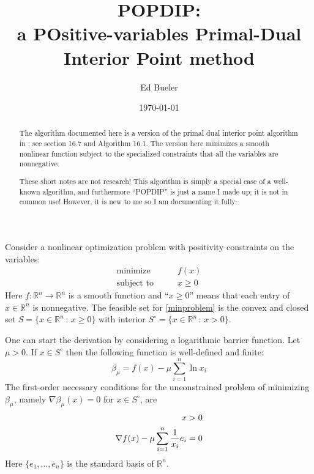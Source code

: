 \documentclass[11pt]{article}
\title{POPDIP: \\ a POsitive-variables Primal-Dual Interior Point method}
\author{Ed Bueler}
\date{\today}
\newcommand{\RR}{\mathbb{R}}
\newcommand{\grad}{\nabla}
\begin{document}
\maketitle

\begin{abstract}
The algorithm documented here is a version of the primal dual interior point algorithm in \cite{GrivaNashSofer2009}; see section 16.7 and Algorithm 16.1.  The version here minimizes a smooth nonlinear function subject to the specialized constraints that all the variables are nonnegative.

These short notes are not research!  This algorithm is simply a special case of a well-known algorithm, and furthermore ``POPDIP'' is just a name I made up; it is not in common use!  However, it is new to me so I am documenting it fully.
\end{abstract}

\thispagestyle{empty}

\bigskip
Consider a nonlinear optimization problem with positivity constraints on the variables:
\begin{equation}
\begin{matrix}
\text{minimize} \qquad & f(x) \\
\text{subject to} \qquad & x \ge 0
\end{matrix} \label{minproblem}
\end{equation}
Here $f:\RR^n\to\RR^n$ is a smooth function and ``$x\ge 0$'' means that each entry of $x\in\RR^n$ is nonnegative.  The feasible set for \eqref{minproblem} is the convex and closed set $S = \{x\in \RR^n\,:\,x\ge 0\}$ with interior $S^\circ = \{x\in \RR^n\,:\,x > 0\}$.

One can start the derivation by considering a logarithmic barrier function.  Let $\mu>0$.  If $x\in S^\circ$ then the following function is well-defined and finite:
\begin{equation}
\beta_\mu = f(x) - \mu \sum_{i=1}^n \ln x_i \label{barrierfunction}
\end{equation}
The first-order necessary conditions for the unconstrained problem of minimizing $\beta_\mu$, namely $\grad \beta_\mu(x)=0$ for $x \in S^\circ$, are
\begin{align}
x &> 0 \label{firstorderbarrier} \\
\grad f(x) - \mu \sum_{i=1}^n \frac{1}{x_i} e_i &= 0 \notag
\end{align}
Here $\{e_1,\dots,e_n\}$ is the standard basis of $\RR^n$.
\end{document}
